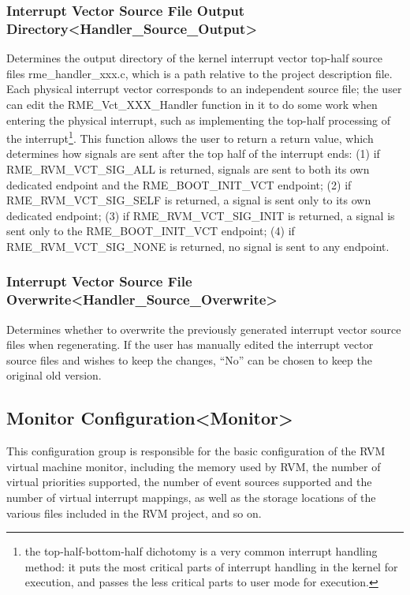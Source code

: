 \subsubsection{Interrupt Vector Source File Output Directory<Handler\_Source\_Output>{}}\label{subsubsec:5-3-12-21}

Determines the output directory of the kernel interrupt vector top-half source files rme\_handler\_xxx.c, which is a path relative to the project description file. Each physical interrupt vector corresponds to an independent source file; the user can edit the RME\_Vct\_XXX\_Handler function in it to do some work when entering the physical interrupt, such as implementing the top-half processing of the interrupt\footnote{the top-half-bottom-half dichotomy is a very common interrupt handling method: it puts the most critical parts of interrupt handling in the kernel for execution, and passes the less critical parts to user mode for execution.}. This function allows the user to return a return value, which determines how signals are sent after the top half of the interrupt ends: (1) if RME\_RVM\_VCT\_SIG\_ALL is returned, signals are sent to both its own dedicated endpoint and the RME\_BOOT\_INIT\_VCT endpoint; (2) if RME\_RVM\_VCT\_SIG\_SELF is returned, a signal is sent only to its own dedicated endpoint; (3) if RME\_RVM\_VCT\_SIG\_INIT is returned, a signal is sent only to the RME\_BOOT\_INIT\_VCT endpoint; (4) if RME\_RVM\_VCT\_SIG\_NONE is returned, no signal is sent to any endpoint.

\subsubsection{Interrupt Vector Source File Overwrite<Handler\_Source\_Overwrite>{}}\label{subsubsec:5-3-12-22}

Determines whether to overwrite the previously generated interrupt vector source files when regenerating. If the user has manually edited the interrupt vector source files and wishes to keep the changes, ``No'' can be chosen to keep the original old version.

\subsection{Monitor Configuration<Monitor>{}}\label{subsec:5-3-13}

This configuration group is responsible for the basic configuration of the RVM virtual machine monitor, including the memory used by RVM, the number of virtual priorities supported, the number of event sources supported and the number of virtual interrupt mappings, as well as the storage locations of the various files included in the RVM project, and so on.


